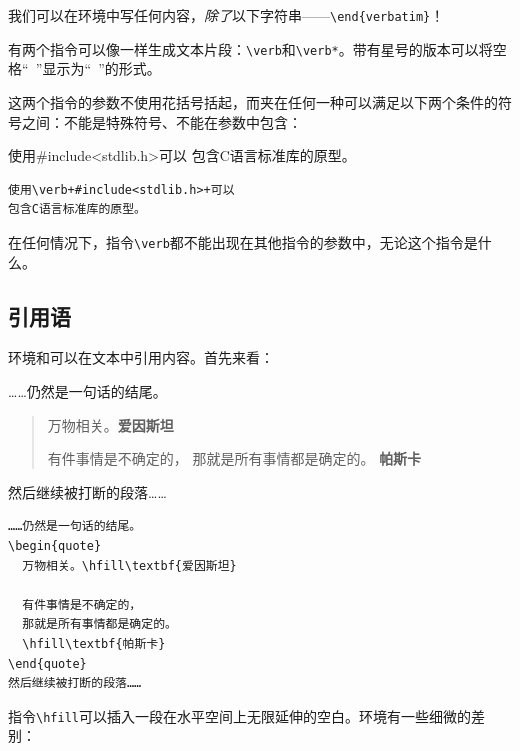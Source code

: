 \begin{exclamation}
我们可以在环境中写任何内容，\emph{除了}以下字符串——\verb|\end{verbatim}|！\\
\end{exclamation}

有两个指令可以像一样生成文本片段：\verb|\verb|和\verb|\verb*|。带有星号的版本可以将空格“\verb| |”显示为“\verb*| |”的形式。

这两个指令的参数不使用花括号括起，而夹在任何一种可以满足以下两个条件的符号之间：不能是特殊符号、不能在参数中包含：

\begin{codelist}[2.14]{
  使用{\ttfamily \#include<stdlib.h>}可以
  包含C语言标准库的原型。
}
\begin{verbatim}
使用\verb+#include<stdlib.h>+可以
包含C语言标准库的原型。\end{verbatim}
\end{codelist}

\begin{exclamation}
在任何情况下，指令\verb|\verb|都不能出现在其他指令的参数中，无论这个指令是\linebreak 什么。
\end{exclamation}

\subsection{引用语}

环境和可以在文本中引用内容。首先来看：

\begin{codelist}[2.15]{
  ……仍然是一句话的结尾。
\begin{quote}
  万物相关。\hfill\textbf{爱因斯坦}

  有件事情是不确定的，
  那就是所有事情都是确定的。
  \hfill\textbf{帕斯卡}
\end{quote}
然后继续被打断的段落……
}
\begin{verbatim}
……仍然是一句话的结尾。
\begin{quote}
  万物相关。\hfill\textbf{爱因斯坦}

  有件事情是不确定的，
  那就是所有事情都是确定的。
  \hfill\textbf{帕斯卡}
\end{quote}
然后继续被打断的段落……\end{verbatim}
\end{codelist}

指令\verb|\hfill|可以插入一段在水平空间上无限延伸的空白。环境有一些细微的差别：

